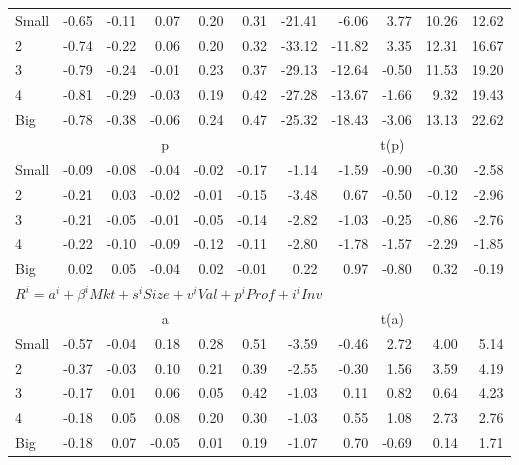 \begin{table}[!ht]
\begin{tabular}{lrrrrrrrrrr}
    \\
      \cmidrule(r){2-6} \cmidrule(r){7-11}

    Small   & -0.65  & -0.11  & 0.07  & 0.20  & 0.31  & -21.41  & -6.06  & 3.77  & 10.26  & 12.62  \\
         2  & -0.74  & -0.22  & 0.06  & 0.20  & 0.32  & -33.12  & -11.82  & 3.35  & 12.31  & 16.67  \\
         3  & -0.79  & -0.24  & -0.01  & 0.23  & 0.37  & -29.13  & -12.64  & -0.50  & 11.53  & 19.20  \\
         4  & -0.81  & -0.29  & -0.03  & 0.19  & 0.42  & -27.28  & -13.67  & -1.66  & 9.32  & 19.43  \\
    Big     & -0.78  & -0.38  & -0.06  & 0.24  & 0.47  & -25.32  & -18.43  & -3.06  & 13.13  & 22.62  \\

  
    
      & \multicolumn{5}{c}{p} & \multicolumn{5}{c}{t(p)}
    
    \\
      \cmidrule(r){2-6} \cmidrule(r){7-11}

    Small   & -0.09  & -0.08  & -0.04  & -0.02  & -0.17  & -1.14  & -1.59  & -0.90  & -0.30  & -2.58  \\
         2  & -0.21  & 0.03  & -0.02  & -0.01  & -0.15  & -3.48  & 0.67  & -0.50  & -0.12  & -2.96  \\
         3  & -0.21  & -0.05  & -0.01  & -0.05  & -0.14  & -2.82  & -1.03  & -0.25  & -0.86  & -2.76  \\
         4  & -0.22  & -0.10  & -0.09  & -0.12  & -0.11  & -2.80  & -1.78  & -1.57  & -2.29  & -1.85  \\
    Big     & 0.02  & 0.05  & -0.04  & 0.02  & -0.01  & 0.22  & 0.97  & -0.80  & 0.32  & -0.19  \\

  \midrule
  \multicolumn{11}{l}{$R^i=a^i+\beta^iMkt+s^iSize+v^iVal+p^iProf+i^iInv$} \\

  
    
      & \multicolumn{5}{c}{a} & \multicolumn{5}{c}{t(a)}
    
    \\
      \cmidrule(r){2-6} \cmidrule(r){7-11}

    Small   & -0.57  & -0.04  & 0.18  & 0.28  & 0.51  & -3.59  & -0.46  & 2.72  & 4.00  & 5.14  \\
         2  & -0.37  & -0.03  & 0.10  & 0.21  & 0.39  & -2.55  & -0.30  & 1.56  & 3.59  & 4.19  \\
         3  & -0.17  & 0.01  & 0.06  & 0.05  & 0.42  & -1.03  & 0.11  & 0.82  & 0.64  & 4.23  \\
         4  & -0.18  & 0.05  & 0.08  & 0.20  & 0.30  & -1.03  & 0.55  & 1.08  & 2.73  & 2.76  \\
    Big     & -0.18  & 0.07  & -0.05  & 0.01  & 0.19  & -1.07  & 0.70  & -0.69  & 0.14  & 1.71  \\


\end{tabular}
\end{table}

